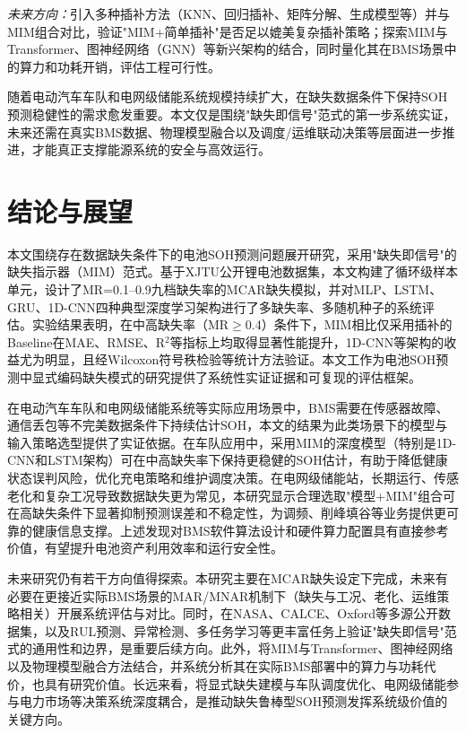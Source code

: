 \documentclass[10pt,a4paper]{ctexart}
\begin{document}
\textit{未来方向：}引入多种插补方法（KNN、回归插补、矩阵分解、生成模型等）并与MIM组合对比，验证"MIM+简单插补"是否足以媲美复杂插补策略；探索MIM与Transformer、图神经网络（GNN）等新兴架构的结合，同时量化其在BMS场景中的算力和功耗开销，评估工程可行性。

随着电动汽车车队和电网级储能系统规模持续扩大，在缺失数据条件下保持SOH预测稳健性的需求愈发重要。本文仅是围绕"缺失即信号"范式的第一步系统实证，未来还需在真实BMS数据、物理模型融合以及调度/运维联动决策等层面进一步推进，才能真正支撑能源系统的安全与高效运行。


\section{结论与展望}\label{sec:conclusion}

本文围绕存在数据缺失条件下的电池SOH预测问题展开研究，采用"缺失即信号"的缺失指示器（MIM）范式。基于XJTU公开锂电池数据集，本文构建了循环级样本单元，设计了MR=0.1--0.9九档缺失率的MCAR缺失模拟，并对MLP、LSTM、GRU、1D-CNN四种典型深度学习架构进行了多缺失率、多随机种子的系统评估。实验结果表明，在中高缺失率（MR$\geq$0.4）条件下，MIM相比仅采用插补的Baseline在MAE、RMSE、R$^2$等指标上均取得显著性能提升，1D-CNN等架构的收益尤为明显，且经Wilcoxon符号秩检验等统计方法验证。本文工作为电池SOH预测中显式编码缺失模式的研究提供了系统性实证证据和可复现的评估框架。

在电动汽车车队和电网级储能系统等实际应用场景中，BMS需要在传感器故障、通信丢包等不完美数据条件下持续估计SOH，本文的结果为此类场景下的模型与输入策略选型提供了实证依据。在车队应用中，采用MIM的深度模型（特别是1D-CNN和LSTM架构）可在中高缺失率下保持更稳健的SOH估计，有助于降低健康状态误判风险，优化充电策略和维护调度决策。在电网级储能站，长期运行、传感老化和复杂工况导致数据缺失更为常见，本研究显示合理选取"模型+MIM"组合可在高缺失条件下显著抑制预测误差和不稳定性，为调频、削峰填谷等业务提供更可靠的健康信息支撑。上述发现对BMS软件算法设计和硬件算力配置具有直接参考价值，有望提升电池资产利用效率和运行安全性。

未来研究仍有若干方向值得探索。本研究主要在MCAR缺失设定下完成，未来有必要在更接近实际BMS场景的MAR/MNAR机制下（缺失与工况、老化、运维策略相关）开展系统评估与对比。同时，在NASA、CALCE、Oxford等多源公开数据集，以及RUL预测、异常检测、多任务学习等更丰富任务上验证"缺失即信号"范式的通用性和边界，是重要后续方向。此外，将MIM与Transformer、图神经网络以及物理模型融合方法结合，并系统分析其在实际BMS部署中的算力与功耗代价，也具有研究价值。长远来看，将显式缺失建模与车队调度优化、电网级储能参与电力市场等决策系统深度耦合，是推动缺失鲁棒型SOH预测发挥系统级价值的关键方向。
\end{document}
